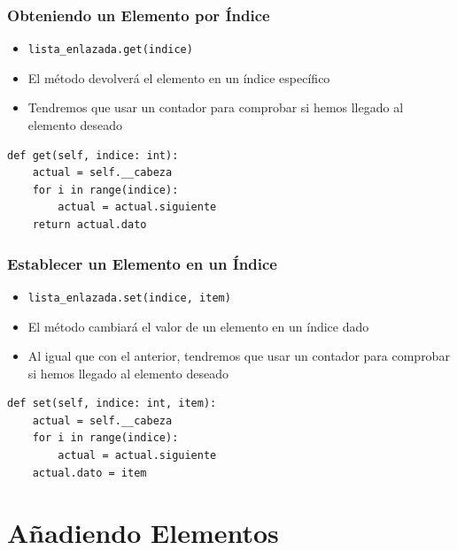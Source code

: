 \documentclass[11pt]{beamer}
\begin{document}
	\begin{frame}[fragile]
		\frametitle{Obteniendo un Elemento por Índice}
		\begin{itemize}
			\item \lstinline|lista_enlazada.get(indice)|
			\item El método devolverá el elemento en un índice específico
			\item Tendremos que usar un contador para comprobar si hemos llegado al elemento deseado
		\end{itemize}
		\vspace{0.5cm}
        \pause
\begin{lstlisting}
def get(self, indice: int):
	actual = self.__cabeza
	for i in range(indice):
		actual = actual.siguiente
	return actual.dato
\end{lstlisting}
	\end{frame}

	\begin{frame}[fragile]
	\frametitle{Establecer un Elemento en un Índice}
	\begin{itemize}
		\item \lstinline|lista_enlazada.set(indice, item)|
		\item El método cambiará el valor de un elemento en un índice dado
		\item Al igual que con el anterior, tendremos que usar un contador para comprobar si hemos llegado al elemento deseado
	\end{itemize}
	\vspace{0.5cm}
    \pause
\begin{lstlisting}
def set(self, indice: int, item):
	actual = self.__cabeza
	for i in range(indice):
		actual = actual.siguiente
	actual.dato = item
\end{lstlisting}
\end{frame}


\section{Añadiendo Elementos}
\end{document}

